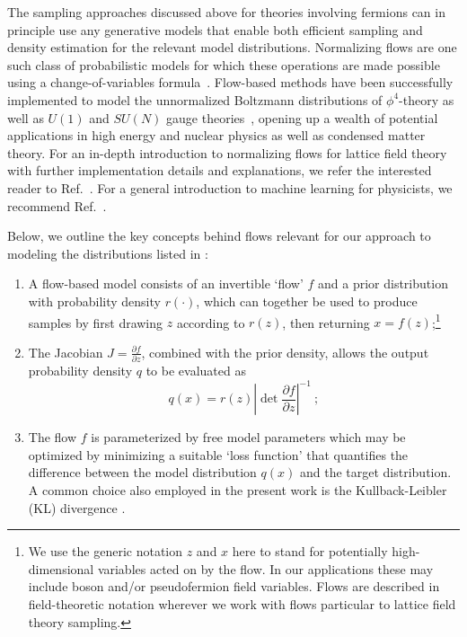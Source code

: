 \documentclass[aps,prd,twocolumn,nofootinbib,superscriptaddress,preprintnumbers]{revtex4-1}
\begin{document}
The sampling approaches discussed above for theories involving fermions can in principle use any generative models that enable both efficient sampling and density estimation for the relevant model distributions. Normalizing flows are one such class of probabilistic models for which these operations are made possible using a change-of-variables formula~\cite{tabak2010,tabak2013,rezende2016variational}. Flow-based methods have been successfully implemented to model the unnormalized Boltzmann distributions of $\phi^4$-theory as well as $U(1)$ and $SU(N)$ gauge theories~\cite{Albergo:2019eim,Nicoli:2020njz,Kanwar:2020xzo,Boyda:2020hsi}, opening up a wealth of potential applications in high energy and nuclear physics as well as condensed matter theory. For an in-depth introduction to normalizing flows for lattice field theory with further implementation details and explanations, we refer the interested reader to Ref.~\cite{Albergo:2021vyo}. For a general introduction to machine learning for physicists, we recommend Ref.~\cite{Mehta_2019}.

Below, we outline the key concepts behind flows relevant for our approach to modeling the distributions listed in :
%
\begin{enumerate}
    \item A flow-based model consists of an invertible `flow' $f$ and a prior distribution with probability density $r(\cdot)$, which can together be used to produce samples by first drawing $z$ according to $r(z)$, then returning $x = f(z)$;\footnote{We use the generic notation $z$ and $x$ here to stand for potentially high-dimensional variables acted on by the flow. In our applications these may include boson and/or pseudofermion field variables. Flows are described in field-theoretic notation wherever we work with flows particular to lattice field theory sampling.}
    \item The Jacobian $J = \frac{\partial f}{\partial z}$, combined with the prior density, allows the output probability density $q$ to be evaluated as
    \begin{equation}\label{eq:logq-generic}
        q(x) = r(z) \left|\det \frac{\partial f}{\partial z} \right|^{-1}\ ;
    \end{equation}
    \item The flow $f$ is parameterized by free model parameters which may be optimized by minimizing a suitable `loss function' that quantifies the difference between the model distribution $q(x)$ and the target distribution. A common choice also employed in the present work is the Kullback-Leibler (KL) divergence \cite{kullback1951information}.
\end{enumerate}
\end{document}
